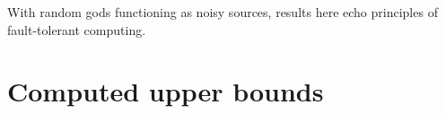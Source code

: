\documentclass[twoside,twocolumn,a4paper,11pt]{article}
\theoremstyle{definition}
\begin{document}
With 
random gods functioning as noisy sources,
results here 
echo
principles of 
fault-tolerant 
computing.\cite{preparata1967connection, pelc1998reliable, pelc2002searching}


\section{Computed upper bounds}
%
%
%
\end{document}
